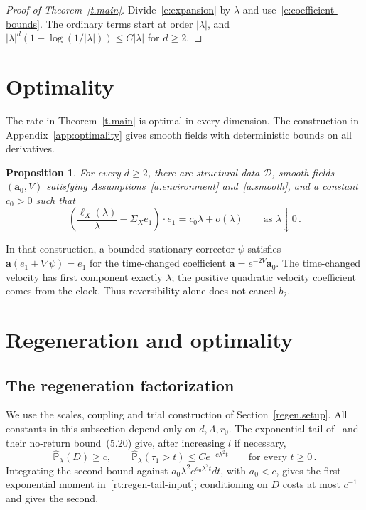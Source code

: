 \documentclass[11pt]{amsart}
\newtheorem{proposition}{Proposition}[section]
\theoremstyle{definition}
\theoremstyle{remark}
\numberwithin{equation}{section}
\renewcommand{\a}{\mathbf a}
\begin{document}
\begin{proof}[Proof of Theorem~\ref{t.main}]
Divide~\eqref{e:expansion} by $\lambda$ and use~\eqref{e:coefficient-bounds}. The ordinary terms start at order $|\lambda|$, and $|\lambda|^d(1+\log(1/|\lambda|))\leq C|\lambda|$ for $d\geq2$.
\end{proof}

\section{Optimality}\label{sec.sharpness}

The rate in Theorem~\ref{t.main} is optimal in every dimension. The construction in Appendix~\ref{app:optimality} gives smooth fields with deterministic bounds on all derivatives.

\begin{proposition}\label{sharp.example}
For every $d\geq2$, there are structural data $\mathcal D$, smooth fields $(\a_0,V)$ satisfying Assumptions~\ref{a.environment} and~\ref{a.smooth}, and a constant $c_0>0$ such that
\begin{equation}\label{eq.sharp-expansion}
 \left(\frac{\ell_X(\lambda)}\lambda-\Sigma_Xe_1\right)\cdot e_1
   =c_0\lambda+o(\lambda)\qquad\text{as }\lambda\downarrow0\, .
\end{equation}
\end{proposition}

In that construction, a bounded stationary corrector $\psi$ satisfies $\a(e_1+\nabla\psi)=e_1$ for the time-changed coefficient $\a=e^{-2V}\a_0$. The time-changed velocity has first component exactly $\lambda$; the positive quadratic velocity coefficient comes from the clock. Thus reversibility alone does not cancel $b_2$. 


\appendix
\section{Regeneration and optimality}\label{app:proofs}

\subsection{The regeneration factorization}\label{app:regeneration}

We use the scales, coupling and trial construction of Section~\ref{regen.setup}. All constants in this subsection depend only on $d,\Lambda,r_0$. The exponential tail of~\citet[Lemma~5.8]{Einstein2012gantert} and their no-return bound~(5.20) give, after increasing $l$ if necessary,
\begin{equation}\label{app:regen-tails}
 \widehat{\mathbb P}_\lambda(D)\geq c,
 \qquad
 \widehat{\mathbb P}_\lambda(\tau_1>t)\leq Ce^{-c\lambda^2t}
 \qquad\text{for every }t\geq0\, .
\end{equation}
Integrating the second bound against $a_0\lambda^2e^{a_0\lambda^2t}dt$, with $a_0<c$, gives the first exponential moment in~\eqref{rt:regen-tail-input}; conditioning on $D$ costs at most $c^{-1}$ and gives the second.
\end{document}

